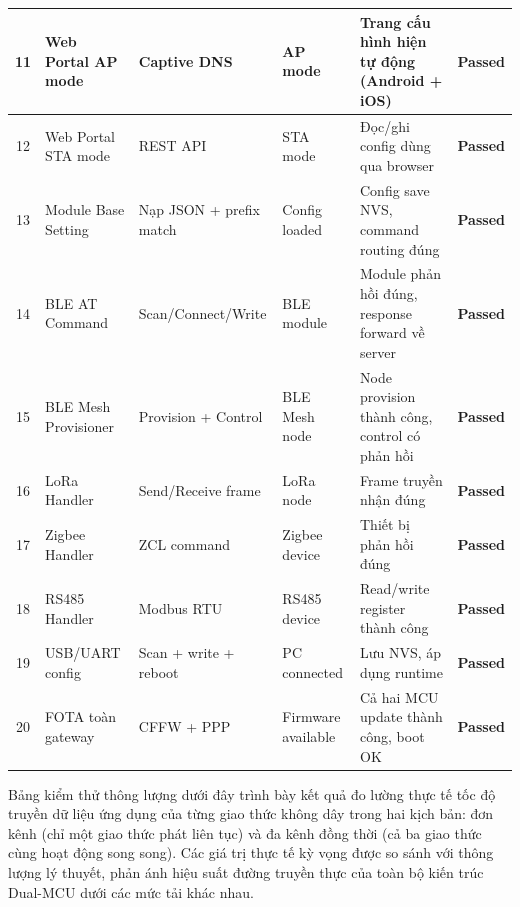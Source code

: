 \begin{longtable}{|c|p{2.5cm}|p{3.5cm}|p{2cm}|p{4cm}|c|}
            11 & Web Portal AP mode & Captive DNS & AP mode & Trang cấu hình hiện tự động (Android + iOS) & \textcolor{modern_blue}{\textbf{Passed}} \\ \hline
            12 & Web Portal STA mode & REST API & STA mode & Đọc/ghi config dùng qua browser & \textcolor{modern_blue}{\textbf{Passed}} \\ \hline
            13 & Module Base Setting & Nạp JSON + prefix match & Config loaded & Config save NVS, command routing đúng & \textcolor{modern_blue}{\textbf{Passed}} \\ \hline
            14 & BLE AT Command & Scan/Connect\newline/Write & BLE module & Module phản hồi đúng, response forward về server & \textcolor{modern_blue}{\textbf{Passed}} \\ \hline
            15 & BLE Mesh Provisioner & Provision + Control & BLE Mesh node & Node provision thành công, control có phản hồi & \textcolor{modern_blue}{\textbf{Passed}} \\ \hline
            16 & LoRa Handler & Send/Receive frame & LoRa node & Frame truyền nhận đúng & \textcolor{modern_blue}{\textbf{Passed}} \\ \hline
            17 & Zigbee Handler & ZCL command & Zigbee device & Thiết bị phản hồi đúng & \textcolor{modern_blue}{\textbf{Passed}} \\ \hline
            18 & RS485 Handler & Modbus RTU & RS485 device & Read/write register thành công & \textcolor{modern_blue}{\textbf{Passed}} \\ \hline
            19 & USB/UART config & Scan + write + reboot & PC connected & Lưu NVS, áp dụng runtime & \textcolor{modern_blue}{\textbf{Passed}} \\ \hline
            20 & FOTA toàn gateway & CFFW + PPP & Firmware available & Cả hai MCU update thành công, boot OK & \textcolor{modern_blue}{\textbf{Passed}} \\ \hline
        \end{longtable}

        Bảng kiểm thử thông lượng dưới đây trình bày kết quả đo lường thực tế tốc độ truyền dữ liệu ứng dụng của từng giao thức không dây trong hai kịch bản: đơn kênh (chỉ một giao thức phát liên tục) và đa kênh đồng thời (cả ba giao thức cùng hoạt động song song). Các giá trị thực tế kỳ vọng được so sánh với thông lượng lý thuyết, phản ánh hiệu suất đường truyền thực của toàn bộ kiến trúc Dual-MCU dưới các mức tải khác nhau.

